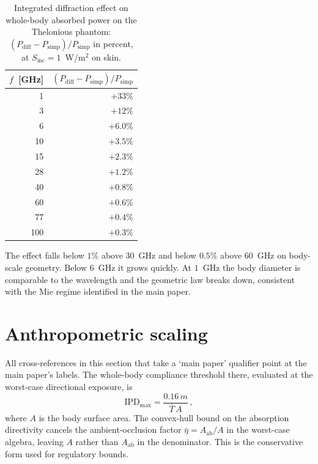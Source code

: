 \documentclass[journal,twocolumn,10pt]{IEEEtran}
\theoremstyle{plain}
\theoremstyle{remark}
\newcommand{\IPD}{\mathrm{IPD}}
\newcommand{\Aab}{A_{\mathrm{ab}}}
\newcommand{\Tbar}{\bar{T}}
\begin{document}
\begin{table}[!t]
\centering
\caption{Integrated diffraction effect on whole-body absorbed power
on the Thelonious phantom: $(P_{\mathrm{diff}} -
P_{\mathrm{simp}})/P_{\mathrm{simp}}$ in percent, at $S_{\mathrm{inc}}
= 1$~W/m$^2$ on skin.}
\label{tab:si-diffraction}
\begin{tabular}{rr}
\toprule
$f$~[GHz] & $(P_{\mathrm{diff}}-P_{\mathrm{simp}})/P_{\mathrm{simp}}$ \\
\midrule
1   & $+33\%$ \\
3   & $+12\%$ \\
6   & $+6.0\%$ \\
10  & $+3.5\%$ \\
15  & $+2.3\%$ \\
28  & $+1.2\%$ \\
40  & $+0.8\%$ \\
60  & $+0.6\%$ \\
77  & $+0.4\%$ \\
100 & $+0.3\%$ \\
\bottomrule
\end{tabular}
\end{table}

The effect falls below $1\%$ above $30$~GHz and below $0.5\%$ above
$60$~GHz on body-scale geometry. Below $6$~GHz it grows quickly. At
$1$~GHz the body diameter is comparable to the wavelength and the
geometric law breaks down, consistent with the Mie regime
identified in the main paper.


\section{Anthropometric scaling}\label{si:anthro}

All cross-references in this section that take a `main paper'
qualifier point at the main paper's labels. The whole-body
compliance threshold there, evaluated at the worst-case directional
exposure, is
\begin{equation}\label{eq:Sinc-max-SI}
  \IPD_{\mathrm{max}} = \frac{0.16\,m}{\Tbar\,A}\, ,
\end{equation}
where $A$ is the body surface area. The convex-hull bound on the
absorption directivity cancels the ambient-occlusion factor
$\bar\eta = \Aab/A$ in the worst-case algebra, leaving $A$ rather
than $\Aab$ in the denominator. This is the conservative form used
for regulatory bounds.
\end{document}
